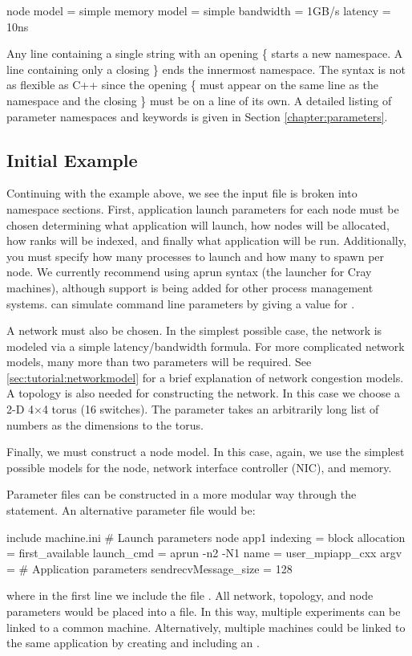 \begin{ViFile}
node {
 model = simple
 memory {
   model = simple
   bandwidth = 1GB/s
   latency = 10ns
 }
}
\end{ViFile}
Any line containing a single string with an opening \{ starts a new namespace.
A line containing only a closing \} ends the innermost namespace.
The syntax is not as flexible as C++ since the opening \{ must appear on the same line as the namespace and the closing \} must be on a line of its own.
A detailed listing of parameter namespaces and keywords is given in Section \ref{chapter:parameters}.

\subsection{Initial Example}
\label{subsec:initialExample}
Continuing with the example above, we see the input file is broken into namespace sections. 
First, application launch parameters for each node must be chosen determining what application will launch, 
how nodes will be allocated, how ranks will be indexed, and finally what application will be run.  
Additionally, you must specify how many processes to launch and how many to spawn per node.  
We currently recommend using aprun syntax (the launcher for Cray machines), 
although support is being added for other process management systems.
\sstmacro can simulate command line parameters by giving a value for .

A network must also be chosen.  
In the simplest possible case, the network is modeled via a simple latency/bandwidth formula.  
For more complicated network models, many more than two parameters will be required. 
See \ref{sec:tutorial:networkmodel} for a brief explanation of \sstmacro network congestion models. 
A topology is also needed for constructing the network.  
In this case we choose a 2-D 4$\times$4 torus (16 switches).  The  
parameter takes an arbitrarily long list of numbers as the dimensions to the torus.

Finally, we must construct a node model.  
In this case, again, we use the simplest possible models for the node, 
network interface controller (NIC), and memory.  

Parameter files can be constructed in a more modular way through the  statement.  
An alternative parameter file would be:

\begin{ViFile}
include machine.ini
# Launch parameters
node {
 app1 {
  indexing = block
  allocation = first_available
  launch_cmd = aprun -n2 -N1
  name = user_mpiapp_cxx
  argv = 
  # Application parameters
  sendrecvMessage_size = 128
 }
}

\end{ViFile}
where in the first line we include the file .  
All network, topology, and node parameters would be placed into a  file.  
In this way, multiple experiments can be linked to a common machine.  
Alternatively, multiple machines could be linked to the same application by creating and including an .
